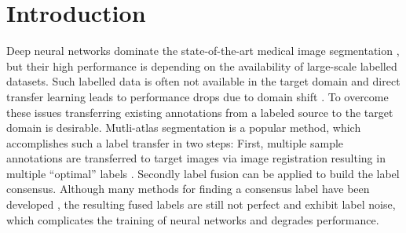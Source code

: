 \section{Introduction}

Deep neural networks dominate the state-of-the-art medical image segmentation \citep{liu2021review,ronneberger2015u,isensee2021nnu}, but their high performance is depending on the availability of large-scale labelled datasets.
Such labelled data is often not available in the target domain and direct transfer learning leads to performance drops due to domain shift \citep{yan2019domain}.
To overcome these issues transferring existing annotations from a labeled source to the target domain is desirable.
Mutli-atlas segmentation is a popular method, which accomplishes such a label transfer in two steps:
First, multiple sample annotations are transferred to target images via image registration \citep{marstal2016simpleelastix,heinrich2012globally,siebert2021fast} resulting in multiple ``optimal'' labels \citep{artaechevarria2009combination}.
Secondly label fusion can be applied to build the label consensus.
Although many methods for finding a consensus label have been developed \citep{artaechevarria2009combination,heckemann2006automatic,rohlfing2004performance,warfield2004simultaneous,wang2013multi}, the resulting fused labels are still not perfect and exhibit label noise, which complicates the training of neural networks and degrades performance.

